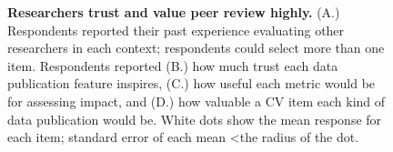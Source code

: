 \documentclass[10pt]{article}
\begin{document}
\begin{figure}[!ht]
\begin{center}
\end{center}
\caption{
{\bf Researchers trust and value peer review highly.}
(A.) Respondents reported their past experience evaluating other researchers in each context; respondents could select more than one item.
Respondents reported (B.) how much trust each data publication feature inspires, (C.) how useful each metric would be for assessing impact, and (D.) how valuable a CV item each kind of data publication would be.
White dots show the mean response for each item; standard error of each mean \textless the radius of the dot.
}

\label{fig:values}
\end{figure}
\end{document}
